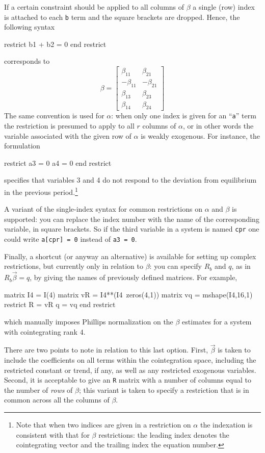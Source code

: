 If a certain constraint should be applied to all columns of $\beta$ a
single (row) index is attached to each \texttt{b} term and the square
brackets are dropped.  Hence, the following syntax
\begin{code}
restrict
  b1 + b2 = 0
end restrict
\end{code}
corresponds to
\[
\beta = \left[
\begin{array}{rr}
\beta_{11} & \beta_{21} \\
-\beta_{11} & -\beta_{21} \\
\beta_{13} & \beta_{23} \\
\beta_{14} & \beta_{24}
\end{array}
\right]
\]
The same convention is used for $\alpha$: when only one index is given
for an ``\texttt{a}'' term the restriction is presumed to apply to all
$r$ columns of $\alpha$, or in other words the variable associated
with the given row of $\alpha$ is weakly exogenous. For instance, the
formulation
%
\begin{code}
restrict
  a3 = 0
  a4 = 0
end restrict
\end{code}
%
specifies that variables 3 and 4 do not respond to the deviation from
equilibrium in the previous period.\footnote{Note that when two
indices are given in a restriction on $\alpha$ the indexation is
consistent with that for $\beta$ restrictions: the leading index
denotes the cointegrating vector and the trailing index the equation
number.}

A variant of the single-index syntax for common restrictions on
$\alpha$ and $\beta$ is supported: you can replace the index number
with the name of the corresponding variable, in square brackets.
So if the third variable in a system is named \texttt{cpr}
one could write \texttt{a[cpr] = 0} instead of \texttt{a3 = 0}.

Finally, a shortcut (or anyway an alternative) is available for
setting up complex restrictions, but currently only in relation to
$\beta$: you can specify $R_b$ and $q$, as in $R_b \vec{\beta} = q$,
by giving the names of previously defined matrices.  For example,
%
\begin{code}
matrix I4 = I(4)
matrix vR = I4**(I4~zeros(4,1))
matrix vq = mshape(I4,16,1)
restrict
  R = vR
  q = vq
end restrict
\end{code}
%
which manually imposes Phillips normalization on the $\beta$ estimates
for a system with cointegrating rank 4. 

There are two points to note in relation to this last option. First,
$\vec{\beta}$ is taken to include the coefficients on all terms within
the cointegration space, including the restricted constant or trend,
if any, as well as any restricted exogenous variables. Second, it is
acceptable to give an \texttt{R} matrix with a number of columns equal
to the number of \textit{rows} of $\beta$; this variant is taken to
specify a restriction that is in common across all the columns of
$\beta$.
 
